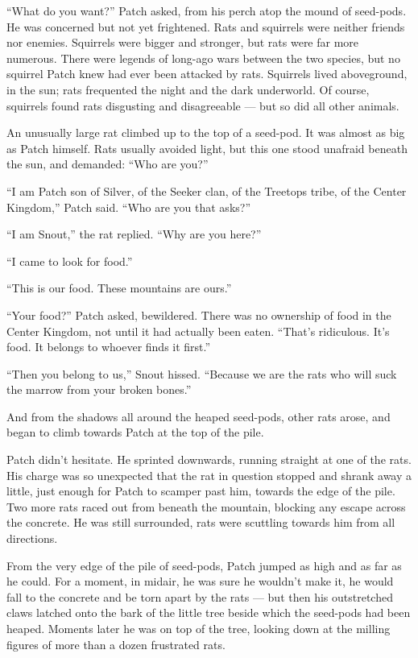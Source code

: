 \documentclass[ebook,oneside,openany,17pt]{memoir}
\begin{document}
“What do you want?” Patch asked, from his perch atop the mound of
seed-pods. He was concerned but not yet frightened. Rats and squirrels
were neither friends nor enemies. Squirrels were bigger and stronger,
but rats were far more numerous. There were legends of long-ago wars
between the two species, but no squirrel Patch knew had ever been
attacked by rats. Squirrels lived aboveground, in the sun; rats
frequented the night and the dark underworld. Of course, squirrels
found rats disgusting and disagreeable — but so did all other animals.

An unusually large rat climbed up to the top of a seed-pod. It was
almost as big as Patch himself. Rats usually avoided light, but this
one stood unafraid beneath the sun, and demanded: “Who are you?”

“I am Patch son of Silver, of the Seeker clan, of the Treetops tribe,
of the Center Kingdom,” Patch said. “Who are you that asks?”

“I am Snout,” the rat replied. “Why are you here?”

“I came to look for food.”

“This is our food. These mountains are ours.”

“Your food?” Patch asked, bewildered. There was no ownership of food
in the Center Kingdom, not until it had actually been eaten. “That’s
ridiculous. It’s food. It belongs to whoever finds it first.”

“Then you belong to us,” Snout hissed. “Because we are the rats who
will suck the marrow from your broken bones.”

And from the shadows all around the heaped seed-pods, other rats
arose, and began to climb towards Patch at the top of the pile.

Patch didn’t hesitate. He sprinted downwards, running straight at one
of the rats. His charge was so unexpected that the rat in question
stopped and shrank away a little, just enough for Patch to scamper
past him, towards the edge of the pile. Two more rats raced out from
beneath the mountain, blocking any escape across the concrete. He was
still surrounded, rats were scuttling towards him from all directions.

From the very edge of the pile of seed-pods, Patch jumped as high and
as far as he could. For a moment, in midair, he was sure he wouldn’t
make it, he would fall to the concrete and be torn apart by the rats —
but then his outstretched claws latched onto the bark of the little
tree beside which the seed-pods had been heaped. Moments later he was
on top of the tree, looking down at the milling figures of more than a
dozen frustrated rats.
\end{document}
